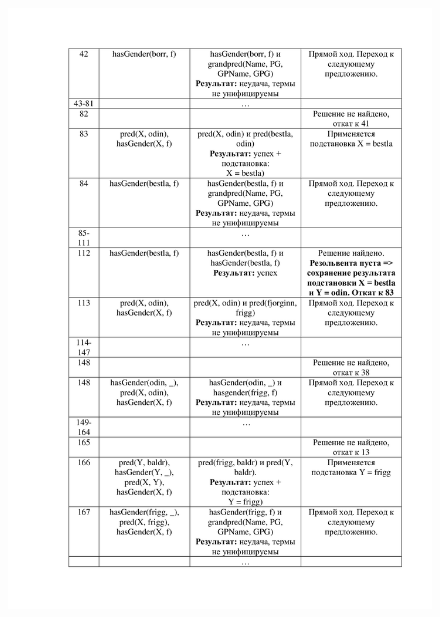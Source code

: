 \documentclass[12pt]{report}
\begin{document}
\begin{figure}[H]
	\centering
	\includegraphics[scale=0.32]{1.png}
	\label{fig:1}
\end{figure}
\end{document}
